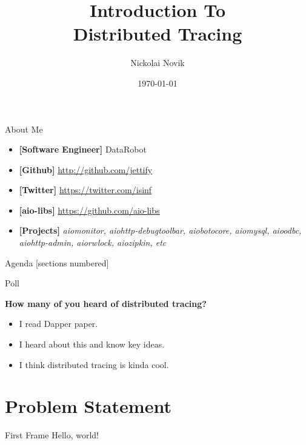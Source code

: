 \documentclass[12pt]{beamer}
\title{Introduction To \\ Distributed Tracing}
\date{\today}
\author{Nickolai Novik}
\institute{\href{http://github.com/jettify}{http://github.com/jettify}}
\begin{document}
  \maketitle
  \begin{frame}{About Me}
    \begin{itemize}
        \item \textbf{[Software Engineer]}  DataRobot
        \item \textbf{[Github]}
            \href{http://github.com/jettify}{http://github.com/jettify}
        \item \textbf{[Twitter]}
            \href{https://twitter.com/isinf}{https://twitter.com/isinf}
        \item \textbf{[aio-libs]}
            \href{https://github.com/aio-libs}{https://github.com/aio-libs}
        \item \textbf{[Projects]}
            \textit{aiomonitor, aiohttp-debugtoolbar,
          aiobotocore, aiomysql, aioodbc, aiohttp-admin, aiorwlock,
          aiozipkin, etc}
    \end{itemize}
  \end{frame}
  \begin{frame}{Agenda}
    [sections numbered]
    \tableofcontents[hideallsubsections]
  \end{frame}
  \begin{frame}{Poll}
      \begin{large}
          \textbf{How many of you heard of distributed tracing?}
      \end{large}
    \begin{itemize}
      \item I read Dapper paper.
      \item I heard about this and know key ideas.
      \item I think distributed tracing is kinda cool.
    \end{itemize}
  \end{frame}
  \section{Problem Statement}
  \begin{frame}{First Frame}
    Hello, world!
  \end{frame}
\end{document}
